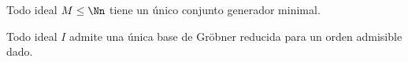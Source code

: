 \begin{lema}\label{l:minimal}
    Todo ideal $M\le \Nn$ tiene un único conjunto generador minimal.
\end{lema}
\begin{teorema}\label{t:reduce}
    Todo ideal $I$ admite una única base de Gröbner reducida para un orden admisible dado.
\end{teorema}
